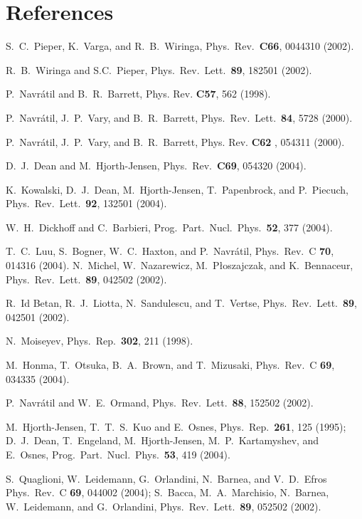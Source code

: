 \documentclass[12pt]{iopart}
\begin{document}
\section*{References}
\begin{thebibliography}{200}


 S.~C.~Pieper, K.~Varga, and R.~B.~Wiringa, Phys.~Rev.~{\bf C66},
0044310 (2002). 

  R.~B.~Wiringa and S.C.~Pieper, Phys.~Rev.~Lett.~{\bf 89},
182501 (2002). 

 P.~Navr\'atil and B.~R.~Barrett, Phys. Rev. {\bf C57}, 562 (1998).

 P.~Navr\'atil, J.~P.~Vary, and B.~R.~Barrett,
Phys.~Rev.~Lett.~{\bf 84}, 5728 (2000).

 P.~Navr\'atil, J.~P.~Vary, and B.~R.~Barrett, 
Phys. Rev. {\bf C62 }, 054311 (2000).

 D.~J.~Dean  and M.~Hjorth-Jensen,
Phys.~Rev.~{\bf C69}, 054320 (2004).
 
 K.~Kowalski, D.~J.~Dean, M.~Hjorth-Jensen, T.~Papenbrock,
and P.~Piecuch, Phys.~Rev.~Lett.~{\bf 92}, 132501 (2004).

 W.~H.~Dickhoff and C.~Barbieri, Prog.~Part.~Nucl.~Phys.~{\bf 52},
377 (2004).

 T.~C.~Luu, S.~Bogner, W.~C.~Haxton, and P.~Navr\'atil, 
Phys.~Rev.~C {\bf 70}, 014316 (2004).
 N.~Michel, W.~Nazarewicz, M.~P{\l}oszajczak, and K.~Bennaceur, 
                 Phys.~Rev.~Lett.~{\bf 89}, 042502 (2002).

R.~Id Betan, R.~J.~Liotta, N.~Sandulescu, and T.~Vertse, 
                 Phys.~Rev.~Lett.~{\bf 89}, 042501 (2002).

 N.~Moiseyev, Phys.~Rep.~{\bf 302}, 211 (1998). 

 M.~Honma, T.~Otsuka, B.~A.~Brown, and T.~Mizusaki, Phys.~Rev.~C {\bf 69},
034335 (2004).

 P.~Navr\'atil and W.~E.~Ormand, Phys.~Rev.~Lett.~{\bf 88},
152502  (2002).

  M.\ Hjorth-Jensen, T.~T.~S.~Kuo and E.~Osnes,
Phys.~Rep.~{\bf 261}, 125 (1995); D.~J.~Dean, T.~Engeland, M.~Hjorth-Jensen, M.~P.~Kartamyshev,
and E.~Osnes, Prog.~Part.~Nucl.~Phys.~{\bf 53}, 419 (2004).

S.~Quaglioni, W.~Leidemann, G.~Orlandini, N.~Barnea, 
and V.~D.~Efros
Phys.~Rev.~C {\bf 69}, 044002 (2004);
S.~Bacca, M.~A.~Marchisio, N.~Barnea, W.~Leidemann, and G.~Orlandini,
Phys.~Rev.~Lett.~{\bf 89}, 052502 (2002).   


\end{thebibliography}
\end{document}
